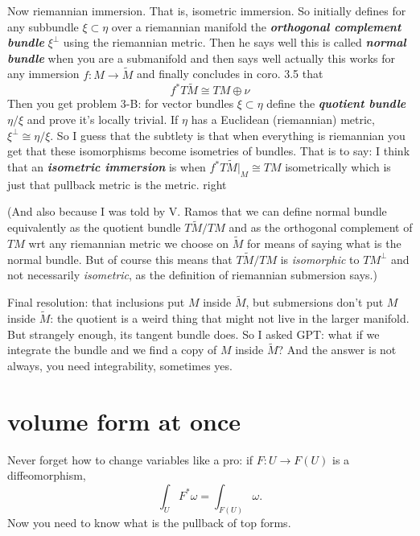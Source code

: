 Now riemannian immersion. That is, isometric immersion. So initially \cite{mc} defines for any subbundle \(\xi \subset \eta\) over a riemannian manifold the  \textit{\textbf{orthogonal complement bundle}} \(\xi^\perp\) using the riemannian metric. Then he says well this is called \textit{\textbf{normal bundle}} when you are a submanifold and then says well actually this works for any immersion \(f:M \to \widetilde{M}\) and finally concludes in coro. 3.5 that
\[f^*T\widetilde{M} \cong TM \oplus  \nu\]
Then you get problem 3-B: for vector bundles \(\xi \subset \eta\) define the \textit{\textbf{quotient bundle}} \(\eta/\xi\) and prove it's locally trivial. If \(\eta\) has a Euclidean (riemannian) metric, \(\xi^\perp \cong \eta/\xi\). So I guess that the subtlety is that when everything is riemannian you get that these isomorphisms become isometries of bundles. That is to say: I think that an \textit{\textbf{isometric immersion}} is when \(f^* T \widetilde{M}|_{M}\cong TM\) isometrically which is just that pullback metric is the metric. right

(And also because I was told by V. Ramos that we can define normal bundle equivalently as the quotient bundle \(T\widetilde{M}/TM\) and as the orthogonal complement of \(TM\) wrt any riemannian metric we choose on \(\widetilde{M}\) for means of saying what is the normal bundle. But of course this means that \(T\widetilde{M}/TM\) is \textit{isomorphic} to \(TM^\perp\) and not necessarily \textit{isometric}, as the definition of riemannian submersion says.)

Final resolution: that inclusions put \(M\) inside \(\widetilde{M}\), but submersions don't put \(M\) inside \(\widetilde{M}\): the quotient is a weird thing that might not live in the larger manifold. But strangely enough, its tangent bundle does. So I asked GPT: what if we integrate the bundle and we find a copy of \(M\) inside \(\widetilde{M}\)? And the answer is not always, you need integrability, sometimes yes.

\section{volume form at once}

Never forget how to change variables like a pro: if \(F:U \to F(U)\) is a diffeomorphism,
\[\int_U F^*\omega=\int_{F(U)}\omega.\]
Now you need to know what is the pullback of top forms. 

